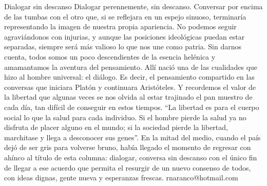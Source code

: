 \documentclass{article}%
\begin{document}
\newline%
%
Dialogar sin descanso%
\newline%
%
Dialogar perennemente, sin descanso. Conversar por encima de las tumbas con el otro que, si se reflejara en un espejo sinuoso, terminaría representando la imagen de nuestra propia apariencia.%
\newline%
%
No podemos seguir agraviándonos con injurias, y aunque las posiciones ideológicas puedan estar separadas, siempre será más valioso lo que nos une como patria.%
\newline%
%
Sin darnos cuenta, todos somos un poco descendientes de la esencia helénica y amamantamos la aventura del pensamiento. Allí nació una de las cualidades que hizo al hombre universal: el diálogo. Es decir, el pensamiento compartido en las conversas que iniciara Platón y continuara Aristóteles.%
\newline%
%
Y recordemos el valor de la libertad que algunas veces se nos olvida al estar trajinado el pan muestro de cada día, tan difícil de conseguir en estos tiempos. “La libertad es para el cuerpo social lo que la salud para cada individuo. Si el hombre pierde la salud ya no disfruta de placer alguno en el mundo; si la sociedad pierde la libertad, marchitase y llega a desconocer sus genes”.%
\newline%
%
En la mitad del medio, cuando el país dejó de ser gris para volverse bruno, había llegado el momento de regresar con ahínco al título de esta columna: dialogar, conversa sin descanso con el único fin de llegar a ese acuerdo que permita el resurgir de un nuevo consenso de todos, con ideas dignas, gente nueva y esperanzas frescas.%
\newline%
%
rnaranco@hotmail.com%
\newline%
%
\end{document}
